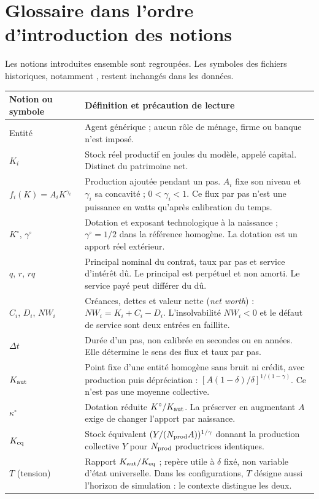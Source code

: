 \section{Glossaire dans l'ordre d'introduction des notions}
\label{sec:definitions}
Les notions introduites ensemble sont regroupées. Les symboles des fichiers
historiques, notamment , restent inchangés dans les données.

\begin{longtable}{@{}p{.21\linewidth}p{.73\linewidth}@{}}
\toprule Notion ou symbole & Définition et précaution de lecture \\
\midrule\endhead
Entité & Agent générique ; aucun rôle de ménage, firme ou banque n'est imposé. \\
$K_i$ & Stock réel productif en joules du modèle, appelé capital. Distinct du patrimoine net. \\
$f_i(K)=A_iK^{\gamma_i}$ & Production ajoutée pendant un pas. $A_i$ fixe son niveau et $\gamma_i$ sa concavité ; $0<\gamma_i<1$. Ce flux par pas n'est une puissance en watts qu'après calibration du temps. \\
$K^\circ$, $\gamma^\circ$ & Dotation et exposant technologique à la naissance ; $\gamma^\circ=1/2$ dans la référence homogène. La dotation est un apport réel extérieur. \\
$q$, $r$, $rq$ & Principal nominal du contrat, taux par pas et service d'intérêt dû. Le principal est perpétuel et non amorti. Le service payé peut différer du dû. \\
$C_i$, $D_i$, $NW_i$ & Créances, dettes et valeur nette (\emph{net worth}) : $NW_i=K_i+C_i-D_i$. L'insolvabilité $NW_i<0$ et le défaut de service sont deux entrées en faillite. \\
$\Delta t$ & Durée d'un pas, non calibrée en secondes ou en années. Elle détermine le sens des flux et taux par pas. \\
$K_{\rm aut}$ & Point fixe d'une entité homogène sans bruit ni crédit, avec production puis dépréciation : $[A(1-\delta)/\delta]^{1/(1-\gamma)}$. Ce n'est pas une moyenne collective. \\
$\kappa^\circ$ & Dotation réduite $K^\circ/K_{\rm aut}$. La préserver en augmentant $A$ exige de changer l'apport par naissance. \\
$K_{\rm eq}$ & Stock équivalent $(Y/(N_{\rm prod}A))^{1/\gamma}$ donnant la production collective $Y$ pour $N_{\rm prod}$ productrices identiques. \\
$T$ (tension) & Rapport $K_{\rm aut}/K_{\rm eq}$ ; repère utile à $\delta$ fixé, non variable d'état universelle. Dans les configurations, $T$ désigne aussi l'horizon de simulation : le contexte distingue les deux. \\

\end{longtable}
